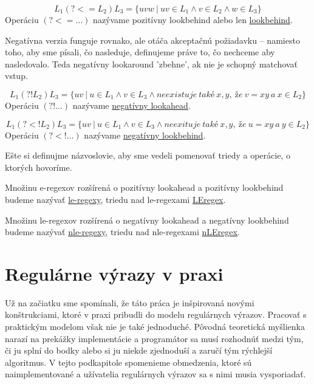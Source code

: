 \begin{df}
$$ L_{1}(?<=L_{2})L_{3} = \lbrace uvw ~|~ uv \in L_{1} \land v \in L_{2} \land w \in L_{3} \rbrace $$ Operáciu $(?<=\dots)$ nazývame pozitívny lookbehind alebo len \underline{lookbehind}.
\end{df}

Negatívna verzia funguje rovnako, ale otáča akceptačnú požiadavku -- namiesto toho, aby sme písali, čo nasleduje, definujeme práve to, čo nechceme aby nasledovalo. Teda negatívny lookaround 'zbehne', ak nie je schopný matchovať vstup.

\begin{df}
$$ L_{1}(?!L_{2})L_{3} = \lbrace uv ~|~ u \in L_{1} \land v \in L_{3} \land neexistuje~také~x,y,~že~v=xy~a~x \in L_2 \rbrace $$ Operáciu $(?!\dots)$ nazývame \underline{negatívny lookahead}.
\end{df}

\begin{df}
$$ L_{1}(?<!L_{2})L_{3} = \lbrace uv ~|~ u \in L_{1} \land v \in L_{3} \land neexituje~také~x,y,~že~u=xy~a~y \in L_2 \rbrace $$ Operáciu $(?<!\dots)$ nazývame \underline{negatívny lookbehind}.
\end{df}

Ešte si definujme názvoslovie, aby sme vedeli pomenovať triedy a operácie, o ktorých hovoríme.

\begin{df}
Množinu e-regexov rozšírená o pozitívny lookahead a pozitívny lookbehind budeme nazývať \underline{le-regexy}, triedu nad le-regexami \underline{LEregex}.
\end{df}

\begin{df}
Množinu le-regexov rozšírená o negatívny lookahead a negatívny lookbehind budeme nazývať \underline{nle-regexy}, triedu nad nle-regexami \underline{nLEregex}.
\end{df}

\section{Regulárne výrazy v praxi}
\label{prax}

Už na začiatku sme spomínali, že táto práca je inšpirovaná novými konštrukciami, ktoré v praxi pribudli do modelu regulárnych výrazov. Pracovať s praktickým modelom však nie je také jednoduché. Pôvodná teoretická myšlienka narazí na prekážky implementácie a programátor sa musí rozhodnúť medzi tým, či ju splní do bodky alebo si ju niekde zjednoduší a zaručí tým rýchlejší algoritmus. V tejto podkapitole spomenieme obmedzenia, ktoré sú naimplementované a užívatelia regulárnych výrazov sa s nimi musia vysporiadať.

